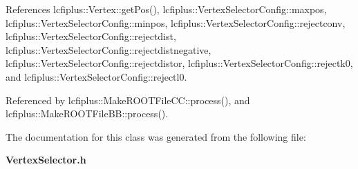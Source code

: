 References lcfiplus\+::\+Vertex\+::get\+Pos(), lcfiplus\+::\+Vertex\+Selector\+Config\+::maxpos, lcfiplus\+::\+Vertex\+Selector\+Config\+::minpos, lcfiplus\+::\+Vertex\+Selector\+Config\+::rejectconv, lcfiplus\+::\+Vertex\+Selector\+Config\+::rejectdist, lcfiplus\+::\+Vertex\+Selector\+Config\+::rejectdistnegative, lcfiplus\+::\+Vertex\+Selector\+Config\+::rejectdistor, lcfiplus\+::\+Vertex\+Selector\+Config\+::rejectk0, and lcfiplus\+::\+Vertex\+Selector\+Config\+::rejectl0.



Referenced by lcfiplus\+::\+Make\+R\+O\+O\+T\+File\+C\+C\+::process(), and lcfiplus\+::\+Make\+R\+O\+O\+T\+File\+B\+B\+::process().



The documentation for this class was generated from the following file\+:\begin{DoxyCompactItemize}
\item 
\textbf{ Vertex\+Selector.\+h}\end{DoxyCompactItemize}
